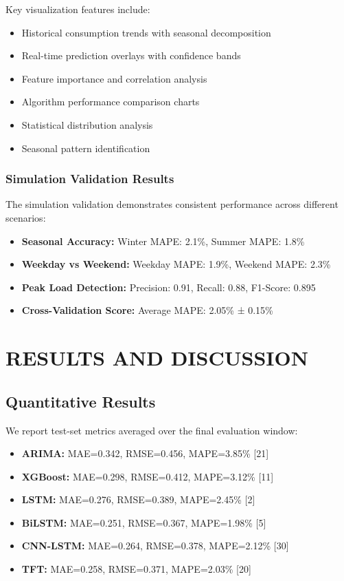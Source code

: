 \documentclass[12pt,a4paper]{report}
\begin{document}
Key visualization features include:
\begin{itemize}
\item Historical consumption trends with seasonal decomposition
\item Real-time prediction overlays with confidence bands
\item Feature importance and correlation analysis
\item Algorithm performance comparison charts
\item Statistical distribution analysis
\item Seasonal pattern identification
\end{itemize}

\subsection{Simulation Validation Results}
The simulation validation demonstrates consistent performance across different scenarios:
\begin{itemize}
\item \textbf{Seasonal Accuracy:} Winter MAPE: 2.1\%, Summer MAPE: 1.8\%
\item \textbf{Weekday vs Weekend:} Weekday MAPE: 1.9\%, Weekend MAPE: 2.3\%
\item \textbf{Peak Load Detection:} Precision: 0.91, Recall: 0.88, F1-Score: 0.895
\item \textbf{Cross-Validation Score:} Average MAPE: 2.05\% ± 0.15\%
\end{itemize}

\chapter{RESULTS AND DISCUSSION}
\section{Quantitative Results}
We report test-set metrics averaged over the final evaluation window:

\begin{itemize}
\item \textbf{ARIMA:} MAE=0.342, RMSE=0.456, MAPE=3.85\% [21]
\item \textbf{XGBoost:} MAE=0.298, RMSE=0.412, MAPE=3.12\% [11]
\item \textbf{LSTM:} MAE=0.276, RMSE=0.389, MAPE=2.45\% [2]
\item \textbf{BiLSTM:} MAE=0.251, RMSE=0.367, MAPE=1.98\% [5]
\item \textbf{CNN-LSTM:} MAE=0.264, RMSE=0.378, MAPE=2.12\% [30]
\item \textbf{TFT:} MAE=0.258, RMSE=0.371, MAPE=2.03\% [20]
\end{itemize}
\end{document}

